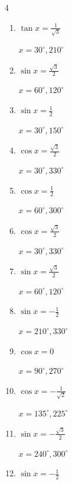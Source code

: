\begin{multicols}{4}
\begin{enumerate}
\columnbreak %

  \item $\displaystyle \tan{x}  = \frac{1}{\sqrt{3}}$

        $\displaystyle x = 30^{\circ} , 210^{\circ}$

  \item $\displaystyle \sin{x}  = \frac{\sqrt{3}}{2}$

        $\displaystyle x = 60^{\circ} , 120^{\circ}$

  \item $\displaystyle \sin{x}  = \frac{1}{2}$

        $\displaystyle x = 30^{\circ} , 150^{\circ}$

  \item $\displaystyle \cos{x}  = \frac{\sqrt{3}}{2}$

        $\displaystyle x = 30^{\circ} , 330^{\circ}$

  \item $\displaystyle \cos{x}  = \frac{1}{2}$

        $\displaystyle x = 60^{\circ} , 300^{\circ}$

  \item $\displaystyle \cos{x}  = \frac{\sqrt{3}}{2}$

        $\displaystyle x = 30^{\circ} , 330^{\circ}$

  \item $\displaystyle \sin{x}  = \frac{\sqrt{3}}{2}$

        $\displaystyle x = 60^{\circ} , 120^{\circ}$

  \item $\displaystyle \sin{x}  = -\frac{1}{2}$

        $\displaystyle x = 210^{\circ} , 330^{\circ}$

  \item $\displaystyle \cos{x}  = 0$

        $\displaystyle x = 90^{\circ} , 270^{\circ}$

  \item $\displaystyle \cos{x}  = -\frac{1}{\sqrt{2}}$

        $\displaystyle x = 135^{\circ} , 225^{\circ}$

  \item $\displaystyle \sin{x}  = -\frac{\sqrt{3}}{2}$

        $\displaystyle x = 240^{\circ} , 300^{\circ}$

  \item $\displaystyle \sin{x}  = -\frac{1}{2}$


\end{enumerate}
\end{multicols}
